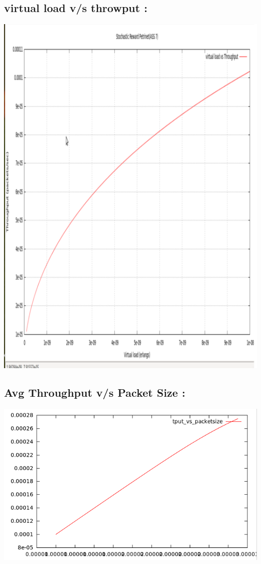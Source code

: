 \documentclass[a4paper,12pt]{article}
\begin{document}
\begin{center}
\subsection {virtual load v/s throwput :}
 \includegraphics[width=15 cm,height=13 cm]{G2.png}
\end{center}
\begin{center}
\subsection {Avg Throughput v/s Packet Size :}
 \includegraphics[width=15 cm,height=13 cm]{tput_packetsize.png}
\end{center}
\end{document}
